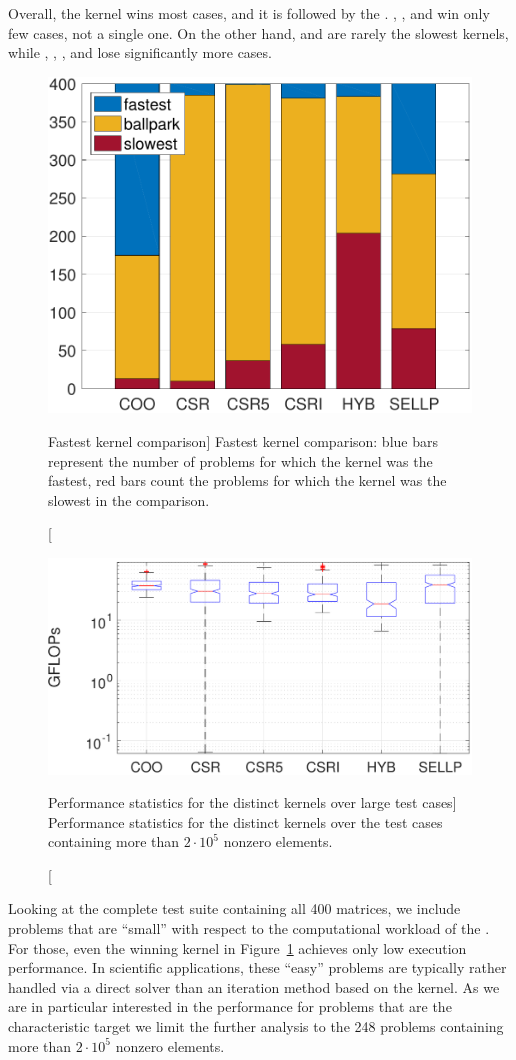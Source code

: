 Overall, the \coo kernel wins most cases, and it is followed by the \sellp
\spmv. \csr, \csri, and \hyb win only few cases, \csrfive not a single one. On
the other hand, \csrfive and \csr are rarely the slowest kernels, while
\coo, \csri, \sellp, and \hyb lose significantly more cases.

\begin{figure}[t]
\begin{center}
\includegraphics[width=.5\columnwidth]{plots/stats0}
\end{center}
\caption
[Fastest kernel comparison]
{Fastest kernel comparison: blue bars represent the number of problems
    for which the kernel was the fastest, red bars count the problems for which
    the kernel was the slowest in the comparison.}
\label{2017-coo-spmv:fig:stats}
\end{figure}

\begin{figure}[t]
\begin{center}
\includegraphics[width=.5\columnwidth]{plots/boxplot_log_csri_2e5}
\end{center}
\caption
[Performance statistics for the distinct kernels over large test cases]
{Performance statistics for the distinct kernels over the test cases containing more than $2\cdot 10^5$ nonzero elements.}
\label{2017-coo-spmv:fig:boxplot}
\end{figure}

Looking at the complete test suite containing all 400 matrices, 
we include problems that are ``small'' with respect to the computational workload of the \spmv.
For those, even the winning kernel in Figure~\ref{2017-coo-spmv:fig:stats} achieves 
only low execution performance. 
In scientific applications, these ``easy'' problems are typically rather handled via a direct solver
than an iteration method based on the \spmv kernel.
As we are in particular interested in the performance for problems 
that are the characteristic target we limit the further analysis to the 248 
problems containing more than $2\cdot 10^5$ nonzero elements.

